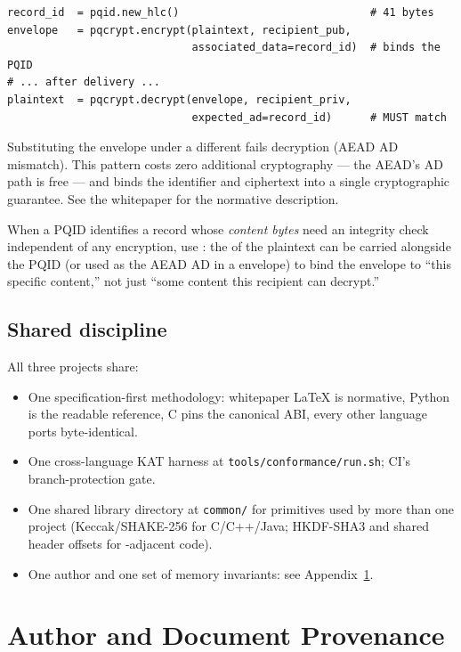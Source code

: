 \begin{lstlisting}[language=Pseudocode]
record_id  = pqid.new_hlc()                              # 41 bytes
envelope   = pqcrypt.encrypt(plaintext, recipient_pub,
                             associated_data=record_id)  # binds the PQID
# ... after delivery ...
plaintext  = pqcrypt.decrypt(envelope, recipient_priv,
                             expected_ad=record_id)      # MUST match
\end{lstlisting}

Substituting the envelope under a different \pqid{} fails decryption (AEAD AD mismatch). This pattern costs zero additional cryptography --- the AEAD's AD path is free --- and binds the identifier and ciphertext into a single cryptographic guarantee. See the \pqcrypt{} whitepaper for the normative description.

When a PQID identifies a record whose \emph{content bytes} need an integrity check independent of any encryption, use \pqhash{}: the \pqhash{} of the plaintext can be carried alongside the PQID (or used as the AEAD AD in a \pqcrypt{} envelope) to bind the envelope to ``this specific content,'' not just ``some content this recipient can decrypt.''

\subsection*{Shared discipline}

All three projects share:

\begin{itemize}
\item One specification-first methodology: whitepaper LaTeX is normative, Python is the readable reference, C pins the canonical ABI, every other language ports byte-identical.
\item One cross-language KAT harness at \texttt{tools/conformance/run.sh}; CI's branch-protection gate.
\item One shared library directory at \texttt{common/} for primitives used by more than one project (Keccak/SHAKE-256 for C/C++/Java; HKDF-SHA3 and shared header offsets for \pqcrypt{}-adjacent code).
\item One author and one set of memory invariants: see Appendix~\ref{sec:appendix-provenance}.
\end{itemize}

\section{Author and Document Provenance}
\label{sec:appendix-provenance}

